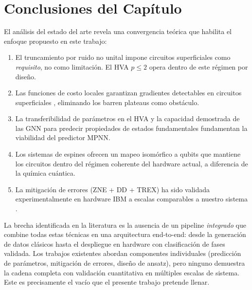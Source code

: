 \documentclass[11pt,a4paper,spanish]{book}
\begin{document}
\section{Conclusiones del Capítulo}

El análisis del estado del arte revela una convergencia teórica que habilita el enfoque propuesto en este trabajo:

\begin{enumerate}
    \item El truncamiento por ruido no unital \citep{mele2026} impone circuitos superficiales como \emph{requisito}, no como limitación. El HVA $p \leq 2$ opera dentro de este régimen por diseño.

    \item Las funciones de costo locales garantizan gradientes detectables en circuitos superficiales \citep{cerezo2021}, eliminando los barren plateaus como obstáculo.

    \item La transferibilidad de parámetros en el HVA \citep{mele2022, puig2025} y la capacidad demostrada de las GNN para predecir propiedades de estados fundamentales \citep{huang2022, zhang2025} fundamentan la viabilidad del predictor MPNN.

    \item Los sistemas de espines ofrecen un mapeo isomórfico a qubits que mantiene los circuitos dentro del régimen coherente del hardware actual, a diferencia de la química cuántica.

    \item La mitigación de errores (ZNE + DD + TREX) ha sido validada experimentalmente en hardware IBM a escalas comparables a nuestro sistema \citep{kiiamov2026, sharma2026}.
\end{enumerate}

La brecha identificada en la literatura es la ausencia de un pipeline \emph{integrado} que combine todas estas técnicas en una arquitectura end-to-end: desde la generación de datos clásicos hasta el despliegue en hardware con clasificación de fases validada. Los trabajos existentes abordan componentes individuales (predicción de parámetros, mitigación de errores, diseño de ansatz), pero ninguno demuestra la cadena completa con validación cuantitativa en múltiples escalas de sistema. Este es precisamente el vacío que el presente trabajo pretende llenar.


\end{document}
